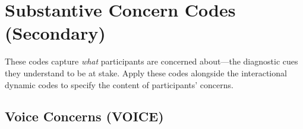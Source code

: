 \documentclass[11pt]{article}
\begin{document}
\newpage
\section{Substantive Concern Codes (Secondary)}

These codes capture \textit{what} participants are concerned about---the diagnostic cues they understand to be at stake. Apply these codes alongside the interactional dynamic codes to specify the content of participants' concerns.

\subsection{Voice Concerns (VOICE)}
\end{document}
